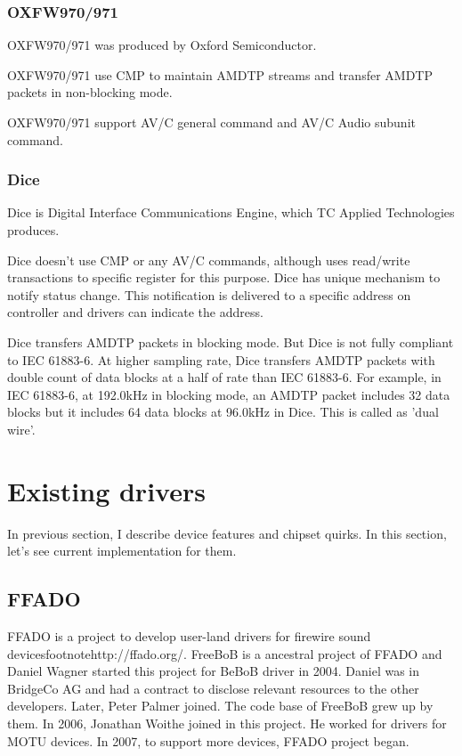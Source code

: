 \documentclass[onecolumn]{article}
\begin{document}
\subsubsection{OXFW970/971}
OXFW970/971 was produced by Oxford Semiconductor.

OXFW970/971 use CMP to maintain AMDTP streams and transfer AMDTP packets in non-blocking mode.

OXFW970/971 support AV/C general command\cite{avc-general-4-2} and AV/C Audio subunit command\cite{avc-audio-1}.

\subsubsection{Dice}
Dice is Digital Interface Communications Engine, which TC Applied Technologies produces.

Dice doesn't use CMP or any AV/C commands, although uses read/write transactions to specific register for this purpose. Dice has unique mechanism to notify status change. This notification is delivered to a specific address on controller and drivers can indicate the address.

Dice transfers AMDTP packets in blocking mode. But Dice is not fully compliant to IEC 61883-6. At higher sampling rate, Dice transfers AMDTP packets with double count of data blocks at a half of rate than IEC 61883-6. For example, in IEC 61883-6, at 192.0kHz in blocking mode, an AMDTP packet includes 32 data blocks but it includes 64 data blocks at 96.0kHz in Dice. This is called as 'dual wire'.


\section{Existing drivers}

In previous section, I describe device features and chipset quirks. In this section, let's see current implementation for them.

\subsection{FFADO}
FFADO is a project to develop user-land drivers for firewire sound devicesfootnote{http://ffado.org/}. FreeBoB is a ancestral project of FFADO and Daniel Wagner started this project for BeBoB driver in 2004. Daniel was in BridgeCo AG and had a contract to disclose relevant resources to the other developers. Later, Peter Palmer joined. The code base of FreeBoB grew up by them. In 2006, Jonathan Woithe joined in this project. He worked for drivers for MOTU devices. In 2007, to support more devices, FFADO project began.
\end{document}
